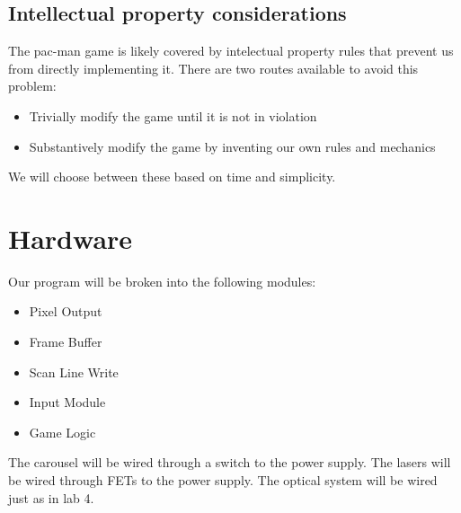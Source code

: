 \documentclass[10pt]{article}
\begin{document}
\subsection{Intellectual property considerations}
The pac-man game is likely covered by intelectual property rules that prevent us from directly implementing it.
There are two routes available to avoid this problem:
\begin{itemize}
  \item Trivially modify the game until it is not in violation
  \item Substantively modify the game by inventing our own rules and mechanics
\end{itemize}
We will choose between these based on time and simplicity.

\section{Hardware}

Our program will be broken into the following modules:
\begin{itemize}
\item Pixel Output
\item Frame Buffer
\item Scan Line Write
\item Input Module
\item Game Logic
\end{itemize}

The carousel will be wired through a switch to the power supply.
The lasers will be wired through FETs to the power supply.
The optical system will be wired just as in lab 4.
\end{document}
